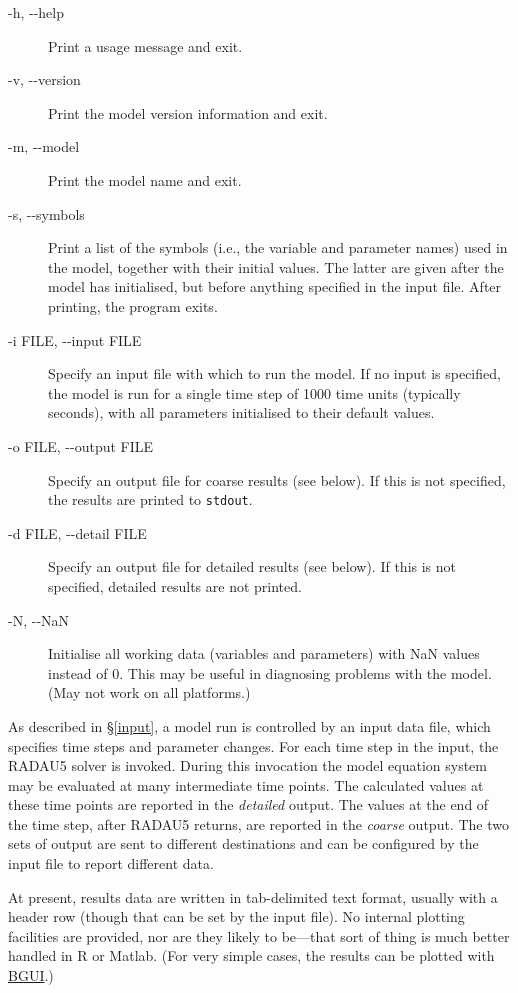 \documentclass[a4paper,11pt]{article}
\begin{document}
\begin{adjustwidth}{0.8cm}{0.8cm}
\begin{description}
\item[-h, -{}-help] Print a usage message and exit.
\item[-v, -{}-version] Print the model version information and exit.
\item[-m, -{}-model] Print the model name and exit.
\item[-s, -{}-symbols] Print a list of the symbols (i.e., the variable and parameter names) used in the model, together with their initial values. The latter are given after the model has initialised, but before anything specified in the input file. After printing, the program exits.
\item[-i FILE, -{}-input FILE] Specify an input file with which to run the model. If no input is specified, the model is run for a single time step of 1000 time units (typically seconds), with all parameters initialised to their default values.
\item[-o FILE, -{}-output FILE] Specify an output file for coarse results (see below). If this is not specified, the results are printed to \texttt{stdout}.
\item[-d FILE, -{}-detail FILE] Specify an output file for detailed results (see below). If this is not specified, detailed results are not printed.
\item[-N, -{}-NaN] Initialise all working data (variables and parameters) with NaN values instead of 0. This may be useful in diagnosing problems with the model. (May not work on all platforms.)
\end{description}
\end{adjustwidth}

As described in \S\ref{input}, a model run is controlled by an input data file, which specifies time steps and parameter changes. For each time step in the input, the RADAU5 solver is invoked. During this invocation the model equation system may be evaluated at many intermediate time points. The calculated values at these time points are reported in the \textit{detailed} output. The values at the end of the time step, after RADAU5 returns, are reported in the \textit{coarse} output. The two sets of output are sent to different destinations and can be configured by the input file to report different data.

At present, results data are written in tab-delimited text format, usually with a header row (though that can be set by the input file). No internal plotting facilities are provided, nor are they likely to be---that sort of thing is much better handled in R or Matlab. (For very simple cases, the results can be plotted with \hyperref[bgui]{BGUI}.)
\end{document}
